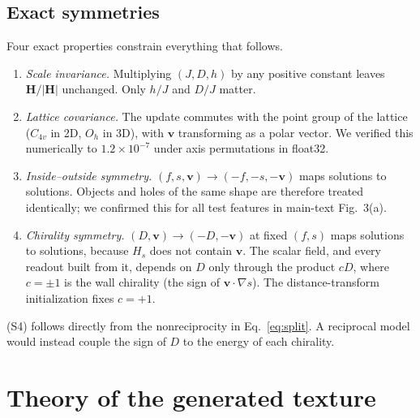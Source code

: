 \documentclass[11pt,a4paper]{article}
\newcommand{\vv}{\bm v}
\begin{document}
\subsection{Exact symmetries}\label{subsec:symm}
Four exact properties constrain everything that follows.
\begin{enumerate}[label=(S\arabic*),leftmargin=2.4em,itemsep=0.1em]
\item \emph{Scale invariance.} Multiplying $(J,D,h)$ by any positive constant leaves $\bm H/|\bm H|$ unchanged. Only $h/J$ and $D/J$ matter.
\item \emph{Lattice covariance.} The update commutes with the point group of the lattice ($C_{4v}$ in 2D, $O_h$ in 3D), with $\vv$ transforming as a polar vector. We verified this numerically to $1.2\times10^{-7}$ under axis permutations in float32.
\item \emph{Inside--outside symmetry.} $(f,s,\vv)\to(-f,-s,-\vv)$ maps solutions to solutions. Objects and holes of the same shape are therefore treated identically; we confirmed this for all test features in main-text Fig.~3(a).
\item \emph{Chirality symmetry.} $(D,\vv)\to(-D,-\vv)$ at fixed $(f,s)$ maps solutions to solutions, because $H_s$ does not contain $\vv$. The scalar field, and every readout built from it, depends on $D$ only through the product $cD$, where $c=\pm1$ is the wall chirality (the sign of $\vv\cdot\nabla s$). The distance-transform initialization fixes $c=+1$.
\end{enumerate}
(S4) follows directly from the nonreciprocity in Eq.~\eqref{eq:split}. A reciprocal model would instead couple the sign of $D$ to the energy of each chirality.

\section{Theory of the generated texture}\label{sec:theory}
\end{document}
